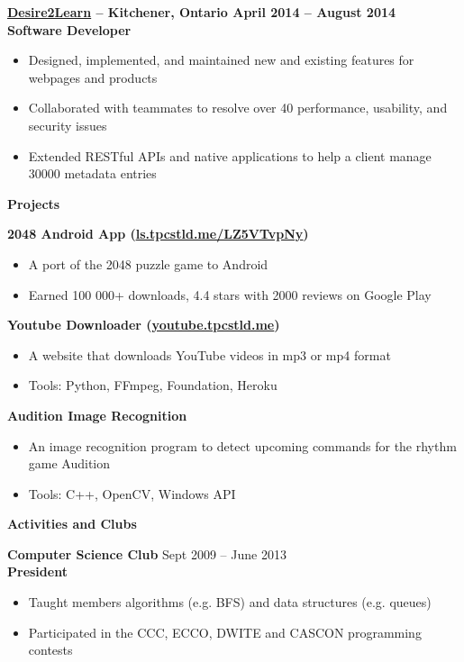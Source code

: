 \documentclass{letter}
\begin{document}
\vspace{-1.5mm}
{\bfseries \href{http://www.d2l.com}{\uline{Desire2Learn}} -- Kitchener, Ontario \hfill April 2014 -- August 2014 \\
{\bfseries Software Developer}
\vspace{-3mm}
\begin{itemize}
    \item Designed, implemented, and maintained new and existing features for webpages and products
    \item Collaborated with teammates to resolve over 40 performance, usability, and security issues
    \item Extended RESTful APIs and native applications to help a client manage 30000 metadata entries
\end{itemize}

{\bfseries \Large Projects}

\vspace{-1.5mm}
{\bfseries 2048 Android App (\href{http://ls.tpcstld.me/LZ5YTvpNy}{\uline{ls.tpcstld.me/LZ5VTvpNy}})}
\vspace{-3mm}
\begin{itemize}
    \item A port of the 2048 puzzle game to Android
    \item Earned 100 000+ downloads, 4.4 stars with 2000 reviews on Google Play
\end{itemize}
\vspace{-3mm}
{\bfseries Youtube Downloader (\href{http://youtube.tpcstld.me}{\uline{youtube.tpcstld.me}})}
\vspace{-3mm}
\begin{itemize}
    \item A website that downloads YouTube videos in mp3 or mp4 format
    \item Tools: Python, FFmpeg, Foundation, Heroku
\end{itemize}
\vspace{-3mm}
{\bfseries Audition Image Recognition}
\vspace{-3mm}
\begin{itemize}
    \item An image recognition program to detect upcoming commands for the rhythm game Audition
    \item Tools: C++, OpenCV, Windows API
\end{itemize}

{\bfseries \Large Activities and Clubs}

\vspace{-1.5mm}
{\bfseries Computer Science Club} \hfill Sept 2009 -- June 2013 \\
{\bfseries President}
\vspace{-3mm}
\begin{itemize}
  \item Taught members algorithms (e.g. BFS) and data structures (e.g. queues)
  \item Participated in the CCC, ECCO, DWITE and CASCON programming contests
\end{itemize}

}
\end{document}
